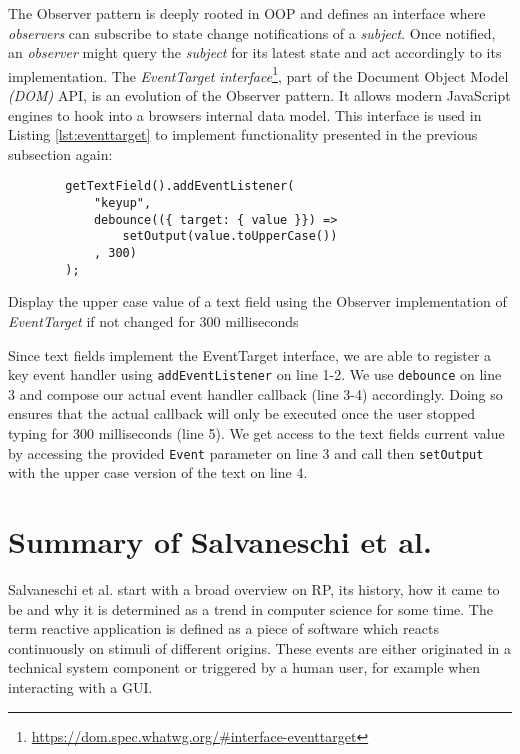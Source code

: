 \documentclass[12pt,a4paper]{article}
\begin{document}
The Observer pattern \cite{gamma1995design} is deeply rooted in OOP and defines an interface where \emph{observers} can subscribe to state change notifications of a \emph{subject}. Once notified, an \emph{observer} might query the \emph{subject} for its latest state and act accordingly to its implementation. The \emph{EventTarget interface}\footnote{\url{https://dom.spec.whatwg.org/\#interface-eventtarget}}, part of the Document Object Model \emph{(DOM)} API, is an evolution of the Observer pattern. It allows modern JavaScript engines to hook into a browsers internal data model. This interface is used in Listing \ref{lst:eventtarget} to implement functionality presented in the previous subsection again:

\begin{listing}[H]
	\begin{verbatim}
		getTextField().addEventListener(
			"keyup",
			debounce(({ target: { value }}) =>
				setOutput(value.toUpperCase())
			, 300)
		);
	\end{verbatim}
	\caption{Display the upper case value of a text field using the Observer implementation of \emph{EventTarget} if not changed for 300 milliseconds}
	\label{lst:eventtarget}
\end{listing}

Since text fields implement the EventTarget interface, we are able to register a key event handler using \texttt{addEventListener} on line 1-2. We use \texttt{debounce} on line 3 and compose our actual event handler callback (line 3-4) accordingly. Doing so ensures that the actual callback will only be executed once the user stopped typing for 300 milliseconds (line 5). We get access to the text fields current value by accessing the provided \texttt{Event} parameter on line 3 and call then \texttt{setOutput} with the upper case version of the text on line 4.

\section{Summary of Salvaneschi et al.}
\label{sec:summary}

Salvaneschi et al. start with a broad overview on RP, its history, how it came to be and why it is determined as a trend in computer science for some time. The term reactive application is defined as a piece of software which reacts continuously on stimuli of different origins. These events are either originated in a technical system component or triggered by a human user, for example when interacting with a GUI.
\end{document}
